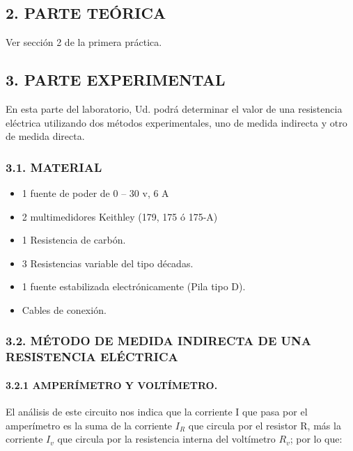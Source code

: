 \documentclass[12pt, a4paper]{article}
\begin{document}
\subsection*{2. PARTE TEÓRICA}
Ver sección 2 de la primera práctica.

\subsection*{3. PARTE EXPERIMENTAL}
En esta parte del laboratorio, Ud. podrá determinar el valor de una resistencia eléctrica utilizando dos métodos 
experimentales, uno de medida indirecta y otro de medida directa.

\subsubsection*{3.1. MATERIAL}
\begin{itemize}
    \item 1 fuente de poder de 0 – 30 v, 6 A
    \item 2 multimedidores Keithley (179, 175 ó 175-A)
    \item 1 Resistencia de carbón.
    \item 3 Resistencias variable del tipo décadas.
    \item 1 fuente estabilizada electrónicamente (Pila tipo D).
    \item Cables de conexión.
\end{itemize}

\subsubsection*{3.2. MÉTODO DE MEDIDA INDIRECTA DE UNA RESISTENCIA ELÉCTRICA}
\paragraph{3.2.1 AMPERÍMETRO Y VOLTÍMETRO.}
El análisis de este circuito nos indica que la corriente I que pasa por el amperímetro es la suma de la corriente 
$I_R$ que circula por el resistor R, más la corriente $I_v$ que circula por la resistencia interna del voltímetro 
$R_v$; por lo que:
\end{document}
